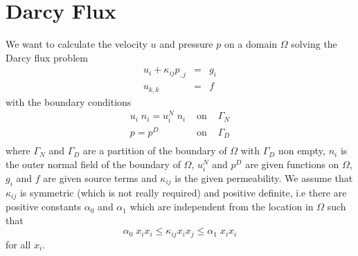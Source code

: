 \section{Darcy Flux}
\label{DARCY FLUX}
We want to calculate the velocity $u$ and pressure $p$ on a domain $\Omega$ solving 
the Darcy flux problem 
\begin{equation}\label{DARCY PROBLEM}
\begin{array}{rcl}
u_{i} + \kappa_{ij} p_{,j} & = & g_{i} \\
u_{k,k} & = & f
\end{array}
\end{equation} 
with the boundary conditions
\begin{equation}\label{DARCY BOUNDARY}
\begin{array}{rcl}
u_{i} \; n_{i}  = u^{N}_{i}  \; n_{i} & \mbox{ on } & \Gamma_{N} \\
p = p^{D} &  \mbox{ on } & \Gamma_{D} \\ 
\end{array}
\end{equation} 
where $\Gamma_{N}$ and $\Gamma_{D}$ are a partition of the boundary of $\Omega$ with $\Gamma_{D}$ non empty, $n_{i}$ is the outer normal field of the boundary of $\Omega$, $u^{N}_{i}$ and $p^{D}$ are given functions on $\Omega$, $g_{i}$ and $f$ are given source terms and $\kappa_{ij}$ is the given permeability. We assume that $\kappa_{ij}$ is symmetric (which is not really required) and positive definite, i.e there are positive constants $\alpha_{0}$ and $\alpha_{1}$ which are independent from the location in $\Omega$ such that
\begin{equation}
\alpha_{0} \; x_{i} x_{i} \le \kappa_{ij} x_{i} x_{j} \le \alpha_{1} \; x_{i} x_{i}
\end{equation}
for all $x_{i}$. 

